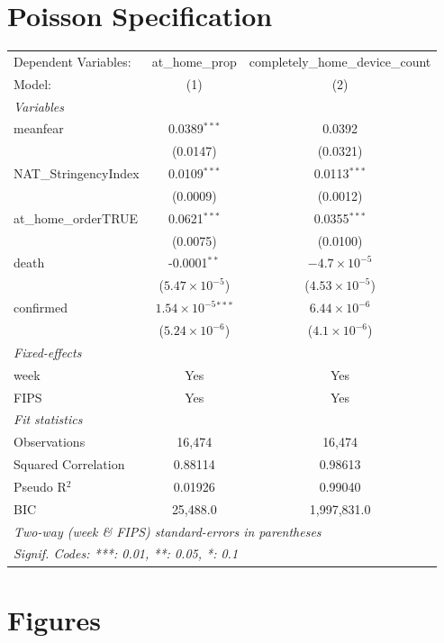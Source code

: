 \documentclass{article}
\begin{document}
\section{Poisson Specification}
\begin{tabular}{lcc}
    \tabularnewline\midrule\midrule
    Dependent Variables:&at\_home\_prop&completely\_home\_device\_count\\
    Model:&(1) & (2)\\
    \midrule \emph{Variables}&   &  \\
    meanfear&0.0389$^{***}$ & 0.0392\\
      &(0.0147) & (0.0321)\\
    NAT\_StringencyIndex&0.0109$^{***}$ & 0.0113$^{***}$\\
      &(0.0009) & (0.0012)\\
    at\_home\_orderTRUE&0.0621$^{***}$ & 0.0355$^{***}$\\
      &(0.0075) & (0.0100)\\
    death&-0.0001$^{**}$ & $-4.7\times 10^{-5}$\\
      &($5.47\times 10^{-5}$) & ($4.53\times 10^{-5}$)\\
    confirmed&$1.54\times 10^{-5}$$^{***}$ & $6.44\times 10^{-6}$\\
      &($5.24\times 10^{-6}$) & ($4.1\times 10^{-6}$)\\
    \midrule \emph{Fixed-effects}&   &  \\
    week & Yes & Yes\\
    FIPS & Yes & Yes\\
    \midrule \emph{Fit statistics}&  & \\
    Observations & 16,474&16,474\\
    Squared Correlation & 0.88114&0.98613\\
    Pseudo R$^2$ & 0.01926&0.99040\\
    BIC & 25,488.0&1,997,831.0\\
    \midrule\midrule\multicolumn{3}{l}{\emph{Two-way (week \& FIPS) standard-errors in parentheses}}\\
    \multicolumn{3}{l}{\emph{Signif. Codes: ***: 0.01, **: 0.05, *: 0.1}}\\
\end{tabular}

\section{Figures}
\end{document}
